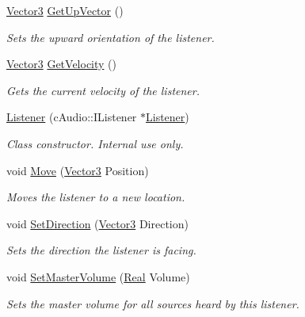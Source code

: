 \begin{DoxyCompactItemize}
\hyperlink{classMezzanine_1_1Vector3}{Vector3} \hyperlink{classMezzanine_1_1Audio_1_1Listener_a715f525d05b60b01850e8d46f26640a4}{GetUpVector} ()
\begin{DoxyCompactList}\small\item\em Sets the upward orientation of the listener. \item\end{DoxyCompactList}\item 
\hyperlink{classMezzanine_1_1Vector3}{Vector3} \hyperlink{classMezzanine_1_1Audio_1_1Listener_a37849fe42431d7a65b57ffffd465bdf0}{GetVelocity} ()
\begin{DoxyCompactList}\small\item\em Gets the current velocity of the listener. \item\end{DoxyCompactList}\item 
\hyperlink{classMezzanine_1_1Audio_1_1Listener_a31804de89544d687005f4e8aa7373f79}{Listener} (cAudio::IListener $\ast$\hyperlink{classMezzanine_1_1Audio_1_1Listener}{Listener})
\begin{DoxyCompactList}\small\item\em Class constructor. Internal use only. \item\end{DoxyCompactList}\item 
void \hyperlink{classMezzanine_1_1Audio_1_1Listener_a9b87e62d1375016ebf4d93b6acc850e0}{Move} (\hyperlink{classMezzanine_1_1Vector3}{Vector3} Position)
\begin{DoxyCompactList}\small\item\em Moves the listener to a new location. \item\end{DoxyCompactList}\item 
void \hyperlink{classMezzanine_1_1Audio_1_1Listener_aad69b1999d6b81e84b7ac6aa8905a574}{SetDirection} (\hyperlink{classMezzanine_1_1Vector3}{Vector3} Direction)
\begin{DoxyCompactList}\small\item\em Sets the direction the listener is facing. \item\end{DoxyCompactList}\item 
void \hyperlink{classMezzanine_1_1Audio_1_1Listener_a7c99b492e90de19622734d2e7552841c}{SetMasterVolume} (\hyperlink{namespaceMezzanine_a726731b1a7df72bf3583e4a97282c6f6}{Real} Volume)
\begin{DoxyCompactList}\small\item\em Sets the master volume for all sources heard by this listener. \item\end{DoxyCompactList}\item 

\end{DoxyCompactItemize}
